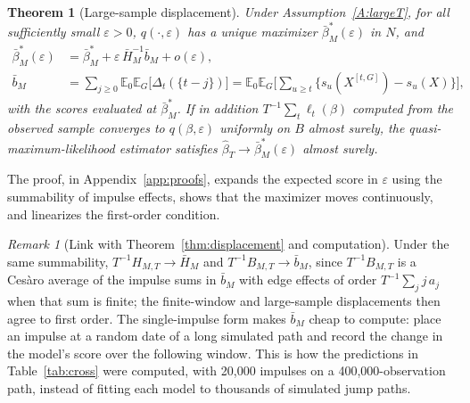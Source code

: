 \documentclass[11pt,a4paper]{article}
\newtheorem{theorem}{Theorem}
\theoremstyle{definition}
\theoremstyle{remark}
\newtheorem{remark}{Remark}
\newcommand{\E}{\mathbb{E}}
\begin{document}
\begin{theorem}[Large-sample displacement]\label{thm:largeT}
Under Assumption~\ref{A:largeT}, for all sufficiently small $\varepsilon>0$, $q(\cdot,\varepsilon)$ has a unique maximizer $\bar\beta^*_M(\varepsilon)$ in $N$, and
\[
\begin{aligned}
\bar\beta^*_M(\varepsilon)&=\bar\beta^*_M+\varepsilon\,\bar H_M^{-1}\bar b_M+o(\varepsilon),\\
\bar b_M&=\sum_{j\ge0}\E_0\E_G\big[\Delta_t(\{t-j\})\big]=\E_0\E_G\Big[\sum_{u\ge t}\big\{s_u(X^{[t,G]})-s_u(X)\big\}\Big],
\end{aligned}
\]
with the scores evaluated at $\bar\beta^*_M$. If in addition $T^{-1}\sum_t\ell_t(\beta)$ computed from the observed sample converges to $q(\beta,\varepsilon)$ uniformly on $B$ almost surely, the quasi-maximum-likelihood estimator satisfies $\hat\beta_T\to\bar\beta^*_M(\varepsilon)$ almost surely.
\end{theorem}
\noindent The proof, in Appendix~\ref{app:proofs}, expands the expected score in $\varepsilon$ using the summability of impulse effects, shows that the maximizer moves continuously, and linearizes the first-order condition.

\begin{remark}[Link with Theorem~\ref{thm:displacement} and computation]\label{rem:largeT}
Under the same summability, $T^{-1}H_{M,T}\to\bar H_M$ and $T^{-1}B_{M,T}\to\bar b_M$, since $T^{-1}B_{M,T}$ is a Ces\`aro average of the impulse sums in $\bar b_M$ with edge effects of order $T^{-1}\sum_jj\,a_j$ when that sum is finite; the finite-window and large-sample displacements then agree to first order. The single-impulse form makes $\bar b_M$ cheap to compute: place an impulse at a random date of a long simulated path and record the change in the model's score over the following window. This is how the predictions in Table~\ref{tab:cross} were computed, with 20{,}000 impulses on a 400{,}000-observation path, instead of fitting each model to thousands of simulated jump paths.
\end{remark}
\end{document}
